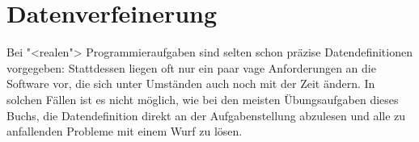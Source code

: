 
\section{Datenverfeinerung}

Bei "<realen"> Programmieraufgaben sind selten schon präzise
Datendefinitionen vorgegeben: Stattdessen liegen oft nur ein paar vage
Anforderungen an die Software vor, die sich unter Umständen auch noch
mit der Zeit ändern.  In solchen Fällen ist es nicht möglich, wie bei
den meisten Übungsaufgaben dieses Buchs, die Datendefinition direkt
an der Aufgabenstellung abzulesen und alle zu anfallenden Probleme mit
einem Wurf zu lösen.

